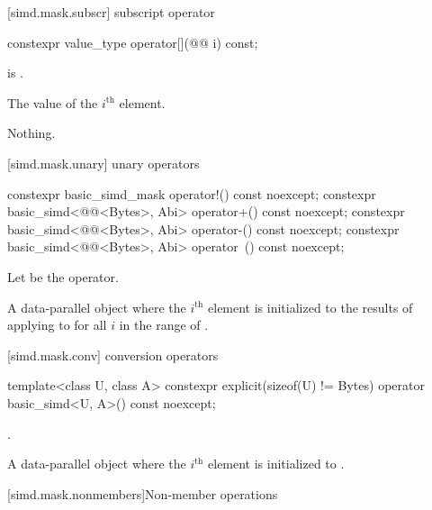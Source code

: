 [simd.mask.subscr]{ subscript operator}

\begin{itemdecl}
constexpr value_type operator[](@@ i) const;
\end{itemdecl}

\begin{itemdescr}
\pnum
\expects
{} is .

\pnum
\returns
The value of the $i^\text{th}$ element.

\pnum
\throws
Nothing.
\end{itemdescr}

[simd.mask.unary]{ unary operators}

\begin{itemdecl}
constexpr basic_simd_mask operator!() const noexcept;
constexpr basic_simd<@@<Bytes>, Abi> operator+() const noexcept;
constexpr basic_simd<@@<Bytes>, Abi> operator-() const noexcept;
constexpr basic_simd<@@<Bytes>, Abi> operator~() const noexcept;
\end{itemdecl}

\begin{itemdescr}
\pnum
Let  be the operator.

\pnum
\returns
A data-parallel object where the $i^\text{th}$ element is initialized to the
results of applying  to  for all $i$ in
the range of .
\end{itemdescr}

[simd.mask.conv]{ conversion operators}

\begin{itemdecl}
template<class U, class A>
  constexpr explicit(sizeof(U) != Bytes) operator basic_simd<U, A>() const noexcept;
\end{itemdecl}

\begin{itemdescr}
\pnum
\constraints
{}.

\pnum
\returns
A data-parallel object where the $i^\text{th}$ element is initialized to
.
\end{itemdescr}

[simd.mask.nonmembers]{Non-member operations}

